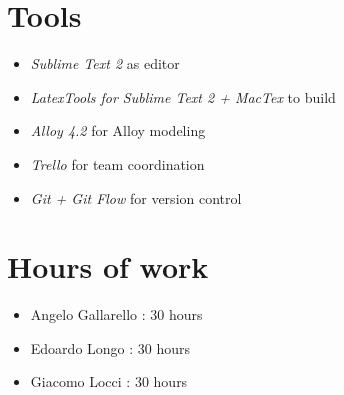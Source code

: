 \begin{appendices}
\section{Tools}

\begin{itemize}
	\item \emph{Sublime Text 2} as editor
	\item \emph{LatexTools for Sublime Text 2 + MacTex}  to build
	\item \emph{Alloy 4.2} for Alloy modeling
	\item \emph{Trello} for team coordination 
	\item \emph{Git + Git Flow} for version control 
\end{itemize}

\section{Hours of work}

\begin{itemize}
	\item Angelo Gallarello : 30 hours
	\item Edoardo Longo : 30 hours
	\item Giacomo Locci : 30 hours
\end{itemize}

\end{appendices}